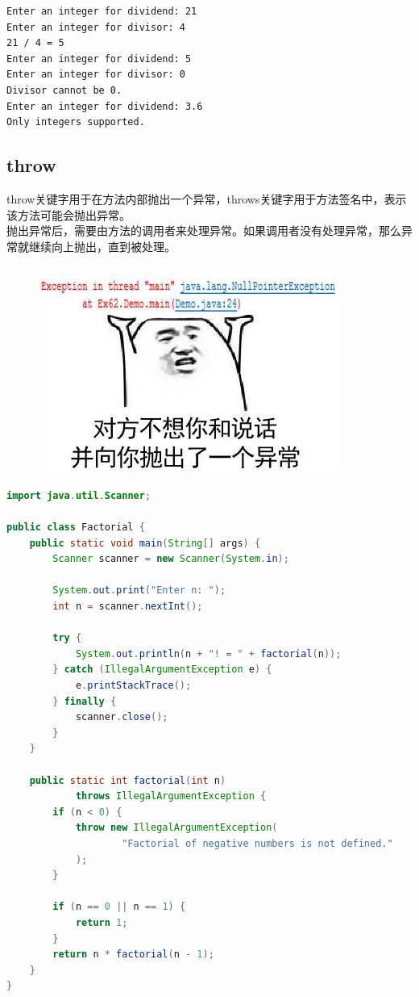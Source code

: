 \begin{tcolorbox}
    \begin{verbatim}
Enter an integer for dividend: 21
Enter an integer for divisor: 4
21 / 4 = 5
Enter an integer for dividend: 5
Enter an integer for divisor: 0
Divisor cannot be 0.
Enter an integer for dividend: 3.6
Only integers supported.
	\end{verbatim}
\end{tcolorbox}

\vspace{0.5cm}

\subsection{throw}

throw关键字用于在方法内部抛出一个异常，throws关键字用于方法签名中，表示该方法可能会抛出异常。\\

抛出异常后，需要由方法的调用者来处理异常。如果调用者没有处理异常，那么异常就继续向上抛出，直到被处理。\\

\begin{figure}[H]
    \centering
    \includegraphics{img/Chapter7/7-1/2.png}
\end{figure}


\begin{lstlisting}[language=Java]
import java.util.Scanner;

public class Factorial {
    public static void main(String[] args) {
        Scanner scanner = new Scanner(System.in);

        System.out.print("Enter n: ");
        int n = scanner.nextInt();

        try {
            System.out.println(n + "! = " + factorial(n));
        } catch (IllegalArgumentException e) {
            e.printStackTrace();
        } finally {
            scanner.close();
        }
    }

    public static int factorial(int n)
            throws IllegalArgumentException {
        if (n < 0) {
            throw new IllegalArgumentException(
                    "Factorial of negative numbers is not defined."
            );
        }

        if (n == 0 || n == 1) {
            return 1;
        }
        return n * factorial(n - 1);
    }
}
\end{lstlisting}

